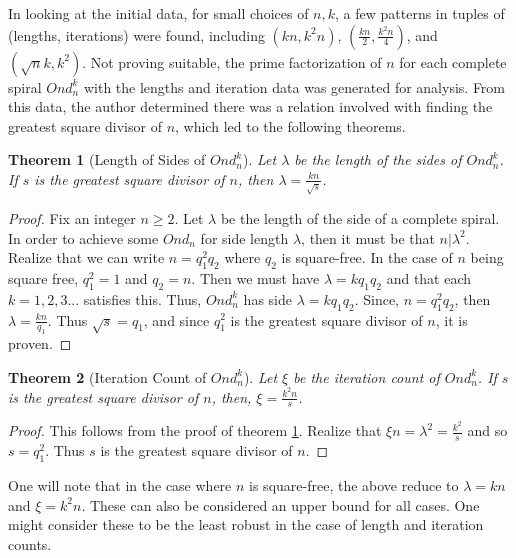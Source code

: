 \documentclass[11pt]{amsart}
\theoremstyle{mydef}
\newtheorem{thm}{Theorem}[section]
\begin{document}
In looking at the initial data, for small choices of $n, k$, a few patterns in tuples of (lengths, iterations) were found, including $(kn, k^2 n)$, $(\frac{kn}{2}, \frac{k^2 n}{4})$, and $(\sqrt{n}k, k^2)$. Not proving suitable, the prime factorization of $n$ for each complete spiral $Ond^k_n$ with the lengths and iteration data was generated for analysis. From this data, the author determined there was a relation involved with finding the greatest square divisor of $n$, which led to the following theorems.

\begin{thm}[Length of Sides of $Ond^k_n$]
Let $\lambda$ be the length of the sides of $Ond^k_n$. If $s$ is the greatest square divisor of $n$, then $\lambda = \frac{kn}{\sqrt{s}}$.
\label{lenthm}
\end{thm}

\begin{proof}
Fix an integer $n \ge 2$.  Let $\lambda$ be the length of the side of a complete spiral. In order to achieve some $Ond_n$ for side length $\lambda$, then it must be that $n \vert \lambda^2$. Realize that we can write $n = q^2_1 q_2$ where $q_2$ is square-free. In the case of $n$ being square free, $q^2_1 = 1$ and $q_2 = n$. Then we must have $\lambda = k q_1 q_2$ and that each $k = 1, 2, 3...$ satisfies this. Thus, $Ond^k_n$ has side $\lambda = k q_1 q_2$. Since, $n = q^2_1 q_2$, then  $\lambda = \frac{kn}{q_1}$. Thus $\sqrt{s} = q_1$, and since $q^2_1$ is the greatest square divisor of $n$, it is proven.
\end{proof}

\begin{thm}[Iteration Count of $Ond^k_n$]
Let $\xi$ be the iteration count  of $Ond^k_n$. If $s$ is the greatest square divisor of $n$,  then, $\xi = \frac{k^2n}{s}$.
\end{thm}


\begin{proof}
This follows from the proof of theorem \ref{lenthm}. Realize that $\xi n = \lambda^2 = \frac{k^2}{s}$ and so $s = q^2_1$. Thus $s$ is the greatest square divisor of $n$.
\end{proof}



One will note that in the case where $n$ is square-free, the above reduce to $\lambda = k n$ and $\xi = k^2 n$. These can also be considered an upper bound for all cases. One might consider these to be the least robust in the case of length and iteration counts.
\end{document}
